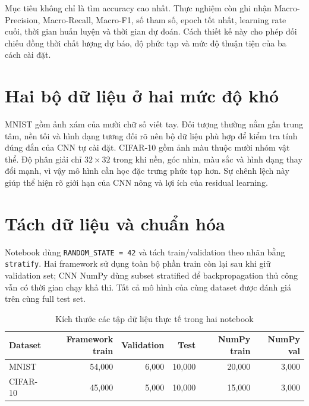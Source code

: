 \documentclass[12pt,a4paper]{report}
\begin{document}
Mục tiêu không chỉ là tìm accuracy cao nhất. Thực nghiệm còn ghi nhận
Macro-Precision, Macro-Recall, Macro-F1, số tham số, epoch tốt nhất, learning
rate cuối, thời gian huấn luyện và thời gian dự đoán. Cách thiết kế này cho phép
đối chiếu đồng thời chất lượng dự báo, độ phức tạp và mức độ thuận tiện của ba
cách cài đặt.

\section{Hai bộ dữ liệu ở hai mức độ khó}
\begin{table}[H]
\centering
\caption{Tổng quan dữ liệu dùng trong Assignment 04}
\label{tab:dataset_overview}
\end{table}

MNIST gồm ảnh xám của mười chữ số viết tay. Đối tượng thường nằm gần trung tâm,
nền tối và hình dạng tương đối rõ nên bộ dữ liệu phù hợp để kiểm tra tính đúng
đắn của CNN tự cài đặt. CIFAR-10 gồm ảnh màu thuộc mười nhóm vật thể. Độ phân
giải chỉ $32\times32$ trong khi nền, góc nhìn, màu sắc và hình dạng thay đổi
mạnh, vì vậy mô hình cần học đặc trưng phức tạp hơn. Sự chênh lệch này giúp thể
hiện rõ giới hạn của CNN nông và lợi ích của residual learning.

\section{Tách dữ liệu và chuẩn hóa}
Notebook dùng \texttt{RANDOM\_STATE = 42} và tách train/validation theo nhãn
bằng \texttt{stratify}. Hai framework sử dụng toàn bộ phần train còn lại sau
khi giữ validation set; CNN NumPy dùng subset stratified để backpropagation thủ
công vẫn có thời gian chạy khả thi. Tất cả mô hình của cùng dataset được đánh
giá trên cùng full test set.

\begin{table}[H]
\centering
\caption{Kích thước các tập dữ liệu thực tế trong hai notebook}
\label{tab:data_splits}
\begin{tabular}{lrrrrr}
\toprule
\textbf{Dataset} & \textbf{Framework train} & \textbf{Validation} & \textbf{Test} & \textbf{NumPy train} & \textbf{NumPy val} \\
\midrule
MNIST & 54,000 & 6,000 & 10,000 & 20,000 & 3,000 \\
CIFAR-10 & 45,000 & 5,000 & 10,000 & 15,000 & 3,000 \\
\bottomrule
\end{tabular}
\end{table}
\end{document}
